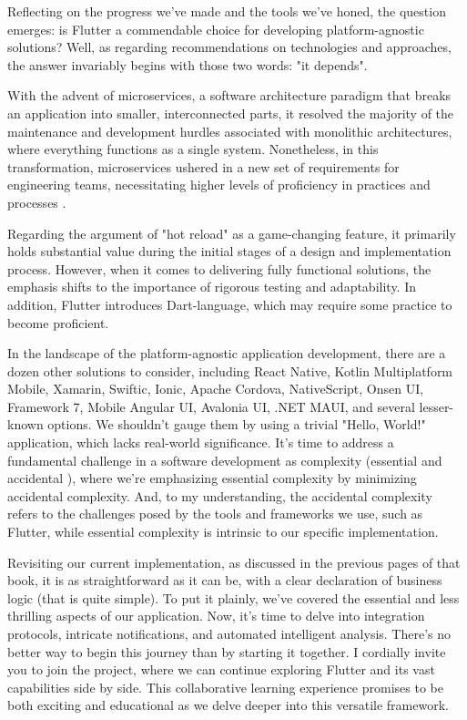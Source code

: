 
Reflecting on the progress we've made and the tools we've honed, the question emerges: is Flutter a commendable 
choice for developing platform-agnostic solutions? Well, as regarding recommendations on technologies and approaches, 
the answer invariably begins with those two words: "it depends".

With the advent of microservices, a software architecture paradigm that breaks an application into smaller, 
interconnected parts, it resolved the majority of the maintenance and development hurdles associated with monolithic 
architectures, where everything functions as a single system. Nonetheless, in this transformation, microservices 
ushered in a new set of requirements for engineering teams, necessitating higher levels of proficiency in practices 
and processes \cite{Mugr23}.

Regarding the argument of "hot reload" as a game-changing feature, it primarily holds substantial value during the 
initial stages of a design and implementation process. However, when it comes to delivering fully functional solutions, 
the emphasis shifts to the importance of rigorous testing and adaptability. In addition, Flutter introduces 
Dart-language, which may require some practice to become proficient.

In the landscape of the platform-agnostic application development, there are a dozen other solutions to consider, 
including React Native, Kotlin Multiplatform Mobile, Xamarin, Swiftic, Ionic, Apache Cordova, NativeScript, Onsen UI, 
Framework 7, Mobile Angular UI, Avalonia UI, .NET MAUI, and several lesser-known options. We shouldn't gauge them by 
using a trivial "Hello, World!" application, which lacks real-world significance. It's time to address a fundamental 
challenge in a software development as complexity (essential and accidental \cite{Broo87}), where we're emphasizing 
essential complexity by minimizing accidental complexity. And, to my understanding, the accidental complexity refers 
to the challenges posed by the tools and frameworks we use, such as Flutter, while essential complexity is intrinsic 
to our specific implementation.

Revisiting our current implementation, as discussed in the previous pages of that book, it is as 
straightforward as it can be, with a clear declaration of business logic (that is quite simple). To put it plainly, 
we've covered the essential and less thrilling aspects of our application. Now, it's time to delve into integration 
protocols, intricate notifications, and automated intelligent analysis. There's no better way to begin this journey 
than by starting it together. I cordially invite you to join the project, where we can continue exploring Flutter and 
its vast capabilities side by side. This collaborative learning experience promises to be both exciting and educational 
as we delve deeper into this versatile framework.
